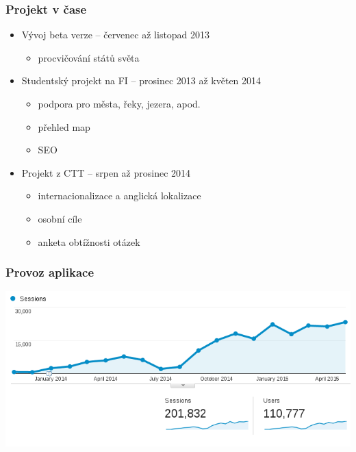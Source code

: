 \documentclass[xcolor=svgnames]{beamer}
\begin{document}
\begin{frame}
	\frametitle{Projekt v čase}
  \begin{itemize}
    \item Vývoj beta verze -- červenec až listopad 2013
    \begin{itemize}
      \item procvičování států světa
    \end{itemize}
    \item Studentský projekt na FI -- prosinec 2013 až květen 2014
    \begin{itemize}
      \item podpora pro města, řeky, jezera, apod.
      \item přehled map
      \item SEO
    \end{itemize}
    \item Projekt z CTT -- srpen až prosinec 2014
    \begin{itemize}
      \item internacionalizace a anglická lokalizace
      \item osobní cíle
      \item anketa obtížnosti otázek
    \end{itemize}
  \end{itemize}
\end{frame}
\begin{frame}
	\frametitle{Provoz aplikace}
   \includegraphics[width=\textwidth]{img/audience.png}
\end{frame}
\end{document}
